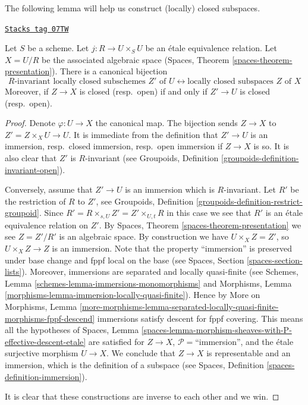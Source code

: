 The following lemma will help us construct
(locally) closed subspaces.

\begin{lemma}
\label{spaces-properties-lemma-subspaces-presentation}
\href{https://stacks.math.columbia.edu/tag/07TW}{\texttt{Stacks tag 07TW}}

Let $S$ be a scheme. Let $j : R \to U \times_S U$ be an \'etale equivalence
relation. Let $X = U/R$ be the associated algebraic space
(Spaces, Theorem \ref{spaces-theorem-presentation}). There is a
canonical bijection
$$
R\text{-invariant locally closed subschemes }Z'\text{ of }U
\leftrightarrow
\text{locally closed subspaces }Z\text{ of }X
$$
Moreover, if $Z \to X$ is closed (resp.\ open) if and only if
$Z' \to U$ is closed (resp.\ open).
\end{lemma}

\begin{proof}
Denote $\varphi : U \to X$ the canonical map. The bijection sends
$Z \to X$ to $Z' = Z \times_X U \to U$. It is immediate from the definition
that $Z' \to U$ is an immersion, resp.\ closed immersion, resp.\ open
immersion if $Z \to X$ is so. It is also clear that $Z'$ is $R$-invariant
(see Groupoids, Definition \ref{groupoids-definition-invariant-open}).

\medskip\noindent
Conversely, assume that $Z' \to U$ is an immersion which is $R$-invariant.
Let $R'$ be the restriction of $R$ to $Z'$, see
Groupoids, Definition \ref{groupoids-definition-restrict-groupoid}.
Since $R' = R \times_{s, U} Z' = Z' \times_{U, t} R$ in this case
we see that $R'$ is an \'etale equivalence relation on $Z'$. By
Spaces, Theorem \ref{spaces-theorem-presentation} we see
$Z = Z'/R'$ is an algebraic space. By construction we have
$U \times_X Z = Z'$, so $U \times_X Z \to Z$ is an immersion.
Note that the property ``immersion'' is preserved under base change
and fppf local on the base (see Spaces, Section \ref{spaces-section-lists}).
Moreover, immersions are separated and locally quasi-finite (see
Schemes, Lemma \ref{schemes-lemma-immersions-monomorphisms}
and
Morphisms, Lemma \ref{morphisms-lemma-immersion-locally-quasi-finite}).
Hence by More on Morphisms, Lemma
\ref{more-morphisms-lemma-separated-locally-quasi-finite-morphisms-fppf-descend}
immersions satisfy descent for fppf covering. This means all the hypotheses of
Spaces,
Lemma \ref{spaces-lemma-morphism-sheaves-with-P-effective-descent-etale}
are satisfied for $Z \to X$, $\mathcal{P}=$``immersion'',
and the \'etale surjective morphism $U \to X$. We conclude that $Z \to X$
is representable and an immersion, which is the
definition of a subspace (see
Spaces, Definition \ref{spaces-definition-immersion}).

\medskip\noindent
It is clear that these constructions are inverse to each other and we win.
\end{proof}

